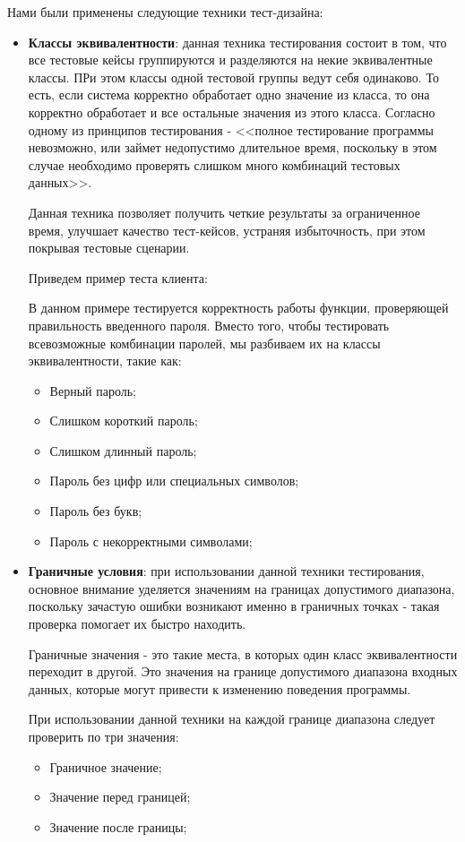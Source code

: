 \documentclass[a4paper, 14pt]{article}
\begin{document}
Нами были применены следующие техники тест-дизайна:

\begin{itemize}
    \item \textbf{Классы эквивалентности}: данная техника тестирования состоит в том, что все тестовые кейсы группируются и разделяются на некие эквивалентные классы. ПРи этом классы одной тестовой группы ведут себя одинаково. То есть, если система корректно обработает одно значение из класса, то она корректно обработает и все остальные значения из этого класса. Согласно одному из принципов тестирования - <<полное тестирование программы невозможно, или займет недопустимо длительное время, поскольку в этом случае необходимо проверять слишком много комбинаций тестовых данных>>.

    Данная техника позволяет получить четкие результаты за ограниченное время, улучшает качество тест-кейсов, устраняя избыточность, при этом покрывая тестовые сценарии.

    Приведем пример теста клиента:

    В данном примере тестируется корректность работы функции, проверяющей правильность введенного пароля. Вместо того, чтобы тестировать всевозможные комбинации паролей, мы разбиваем их на классы эквивалентности, такие как:
    \begin{itemize}
        \item Верный пароль;
        \item Слишком короткий пароль;
        \item Слишком длинный пароль;
        \item Пароль без цифр или специальных символов;
        \item Пароль без букв;
        \item Пароль с некорректными символами;
    \end{itemize}

    \item \textbf{Граничные условия}: при использовании данной техники тестирования, основное внимание уделяется значениям на границах допустимого диапазона, поскольку зачастую ошибки возникают именно в граничных точках - такая проверка помогает их быстро находить.

    Граничные значения - это такие места, в которых один класс эквивалентности переходит в другой. Это значения на границе допустимого диапазона входных данных, которые могут привести к изменению поведения программы.

    При использовании данной техники на каждой границе диапазона следует проверить по три значения:
    \begin{itemize}
        \item Граничное значение;
        \item Значение перед границей;
        \item Значение после границы;
    \end{itemize}


\end{itemize}
\end{document}
